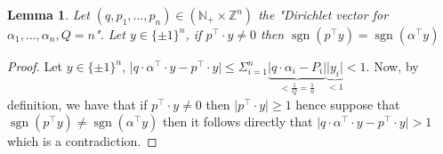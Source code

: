 \documentclass[a4paper,11pt,american]{article}
\newcommand{\N}{\mathbb{N}}
\newcommand{\Z}{\mathbb{Z}}
\DeclareMathOperator{\sign}{sgn}
\theoremstyle{plain}
\newtheorem{lemma}[theorem]{Lemma}
\theoremstyle{definition}
\begin{document}
\begin{lemma}
    Let $(q,p_1,\dots,p_n)\in (\N_+\times\Z^n)$ the "Dirichlet vector for $\alpha_1,\dots,\alpha_n,Q=n$". Let $y\in\{\pm 1\}^n$, if $p^\top\cdot y\neq 0$ then $\sign(p^\top y)=\sign(\alpha^\top y)$
\end{lemma}
\begin{proof}
    Let $y\in\{\pm 1\}^n$, $\vert q\cdot\alpha^\top\cdot y-p^\top\cdot y\vert\leq \Sigma_{i=1}^n\underbrace{\vert q\cdot\alpha_i-P_{i}\vert}_{<\frac{1}{Q}=\frac{1}{n}}\underbrace{\vert y_i\vert}_{<1}< 1$. Now, by definition, we have that if $p^\top\cdot y\neq 0$ then $\vert p^\top\cdot y\vert \geq 1$ hence suppose that $\sign(p^\top y)\neq\sign(\alpha^\top y)$ then it follows directly that $\vert q\cdot\alpha^\top\cdot y-p^\top\cdot y\vert> 1$ which is a contradiction.
\end{proof}
\end{document}
